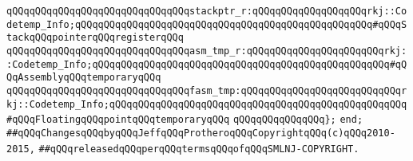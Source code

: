 \newline
\verb|qQQqqQQqqQQqqQQqqQQqqQQqqQQqqQQqstackptr_r:qQQqqQQqqQQqqQQqqQQqrkj::Codetemp_Info;qQQqqQQqqQQqqQQqqQQqqQQqqQQqqQQqqQQqqQQqqQQqqQQqqQQq#qQQqStackqQQqpointerqQQqregisterqQQq|\newline
\verb|qQQqqQQqqQQqqQQqqQQqqQQqqQQqqQQqasm_tmp_r:qQQqqQQqqQQqqQQqqQQqqQQqrkj::Codetemp_Info;qQQqqQQqqQQqqQQqqQQqqQQqqQQqqQQqqQQqqQQqqQQqqQQqqQQq#qQQqAssemblyqQQqtemporaryqQQq|\newline
\verb|qQQqqQQqqQQqqQQqqQQqqQQqqQQqqQQqfasm_tmp:qQQqqQQqqQQqqQQqqQQqqQQqqQQqrkj::Codetemp_Info;qQQqqQQqqQQqqQQqqQQqqQQqqQQqqQQqqQQqqQQqqQQqqQQqqQQq#qQQqFloatingqQQqpointqQQqtemporaryqQQq|\newline
\verb|qQQqqQQqqQQqqQQq};|\newline
\verb|end;|\newline
\newline
\newline
\verb|##qQQqChangesqQQqbyqQQqJeffqQQqProtheroqQQqCopyrightqQQq(c)qQQq2010-2015,|\newline
\verb|##qQQqreleasedqQQqperqQQqtermsqQQqofqQQqSMLNJ-COPYRIGHT.|\newline

